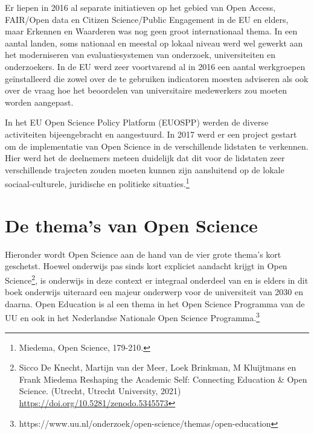 \documentclass[empirical, authordate, ]{new-jote-article}
\begin{document}
	Er liepen in 2016 al separate initiatieven op het gebied van Open Access, FAIR/Open data en Citizen Science/Public Engagement in de EU en elders, maar Erkennen en Waarderen was nog geen groot internationaal thema. In een aantal landen, soms nationaal en meestal op lokaal niveau werd wel gewerkt aan het moderniseren van evaluatiesystemen van onderzoek, universiteiten en onderzoekers. In de EU werd zeer voortvarend al in 2016 een aantal werkgroepen geïnstalleerd die zowel over de te gebruiken indicatoren moesten adviseren als ook over de vraag hoe het beoordelen van universitaire medewerkers zou moeten worden aangepast.



	In het EU Open Science Policy Platform (EUOSPP) werden de diverse activiteiten bijeengebracht en aangestuurd. In 2017 werd er een project gestart om de implementatie van Open Science in de verschillende lidstaten te verkennen. Hier werd het de deelnemers meteen duidelijk dat dit voor de lidstaten zeer verschillende trajecten zouden moeten kunnen zijn aansluitend op de lokale sociaal-culturele, juridische en politieke situaties.\footnote{Miedema, Open Science, 179-210.}



	\section{De thema's van Open Science}



	Hieronder wordt Open Science aan de hand van de vier grote thema's kort geschetst. Hoewel onderwijs pas sinds kort expliciet aandacht krijgt in Open Science\footnote{Sicco De Knecht, Martijn van der Meer, Loek Brinkman, M Kluijtmans en Frank Miedema Reshaping the Academic Self: Connecting Education \& Open Science. (Utrecht, Utrecht University, 2021) \href{https://doi.org/10.5281/zenodo.5345573}{https://doi.org/10.5281/zenodo.5345573} }, is onderwijs in deze context er integraal onderdeel van en is elders in dit boek onderwijs uiteraard een majeur onderwerp voor de universiteit van 2030 en daarna. Open Education is al een thema in het Open Science Programma van de UU en ook in het Nederlandse Nationale Open Science Programma.\footnote{https://www.uu.nl/onderzoek/open-science/themas/open-education}
\end{document}
